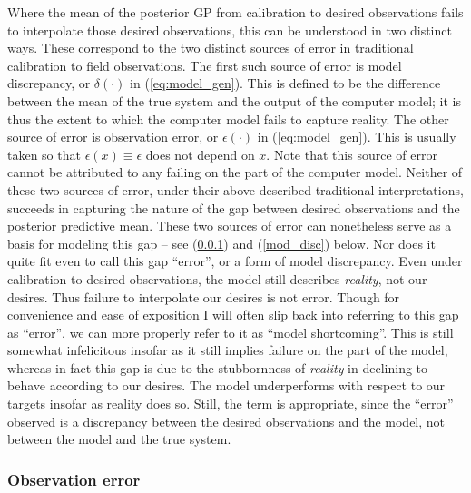 \documentclass{article}
\begin{document}
Where the mean of the posterior GP from calibration to desired observations fails to interpolate those desired observations, this can be understood in two distinct ways. These correspond to the two distinct sources of error in traditional calibration to field observations. The first such source of error is model discrepancy, or $\delta(\cdot)$ in (\ref{eq:model_gen}). This is defined to be the difference between the mean of the true system and the output of the computer model; it is thus the extent to which the computer model fails to capture reality. The other source of error is observation error, or $\epsilon(\cdot)$ in (\ref{eq:model_gen}). This is usually taken so that $\epsilon(x) \equiv \epsilon$ does not depend on $x$. Note that this source of error cannot be attributed to any failing on the part of the computer model. Neither of these two sources of error, under their above-described traditional interpretations, succeeds in capturing the nature of the gap between desired observations and the posterior predictive mean. These two sources of error can nonetheless serve as a basis for modeling this gap -- see (\ref{obs_error}) and (\ref{mod_disc}) below.
Nor does it quite fit even to call this gap ``error'', or a form of model discrepancy. Even under calibration to desired observations, the model still describes \emph{reality}, not our desires. Thus failure to interpolate our desires is not error. Though for convenience and ease of exposition I will often slip back into referring to this gap as ``error'', we can more properly refer to it as ``model shortcoming''. This is still somewhat infelicitous insofar as it still implies failure on the part of the model, whereas in fact this gap is due to the stubbornness of \emph{reality} in declining to behave according to our desires. %
The model underperforms with respect to our targets insofar as reality does so. Still, the term is appropriate, since the ``error'' observed is a discrepancy between the desired observations and the model, not between the model and the true system.

\subsubsection{Observation error}\label{obs_error}

\end{document}
